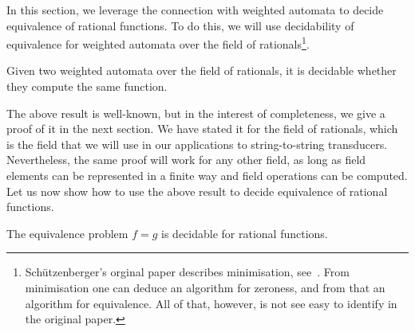 In this section, we leverage the connection with weighted automata to decide equivalence of rational functions. To do this, we will use decidability of equivalence for weighted automata over the  field of rationals\footnote{Sch\"utzenberger's orginal paper describes minimisation, see~\cite[Section B]{Schutzenberger1961OnTheDefinition}. From minimisation one can deduce an algorithm for zeroness, and from that an algorithm for equivalence. All of that, however, is not see easy to identify in the original paper.}.
\begin{theorem}\label{thm:equivalence-weighted-automata}
    Given two weighted automata over the field of rationals, it is decidable whether they compute the same function.    
\end{theorem}
The above result is well-known, but in the interest of completeness, we give a proof of it in the next section.  We have stated it for the field of rationals, which is the field that we will use in our applications to string-to-string transducers. Nevertheless, the same proof will work  for any other field, as long as field elements can be represented in a finite way and field operations can be computed. Let us now show how to use the above result to decide equivalence of rational functions.
\begin{theorem}\label{thm:equivalence-rational-functions}
    The equivalence problem $f=g$ is decidable for rational functions.
\end{theorem}
